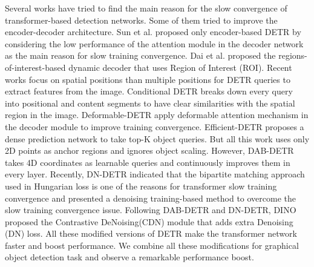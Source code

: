 \documentclass[sn-mathphys]{sn-jnl}\jyear{2021}\theoremstyle{thmstyleone}\newtheorem{theorem}{Theorem}\newtheorem{proposition}[theorem]{Proposition}\theoremstyle{thmstyletwo}\newtheorem{example}{Example}\newtheorem{remark}{Remark}\theoremstyle{thmstylethree}\newtheorem{definition}{Definition}\usepackage{amsmath}
\begin{document}
Several works \cite { CondDE, dab89, Reth78, anchorDE, Deformable54, DynamicDE} have tried to find the main reason for the slow convergence of transformer-based detection networks. Some of them tried to improve the encoder-decoder architecture. Sun et al. \cite{Reth78} proposed only encoder-based DETR by considering the low performance of the attention module in the decoder network as the main reason for slow training convergence. Dai et al. \cite{DynamicDE} proposed the regions-of-interest-based dynamic decoder that uses Region of Interest (ROI). Recent works \cite{dab89, CondDE, anchorDE, Deformable54} focus on spatial positions than multiple positions for DETR queries to extract features from the image. Conditional DETR \cite{CondDE} breaks down every query into positional and content segments to have clear similarities with the spatial region in the image. Deformable-DETR \cite{Deformable54} apply deformable attention mechanism in the decoder module to improve training convergence. Efficient-DETR \cite{efficientDE} proposes a dense prediction network to take top-K object queries. But all this work uses only 2D points as anchor regions and ignores object scaling. However, DAB-DETR \cite{dab89} takes 4D coordinates as learnable queries and continuously improves them in every layer. Recently, DN-DETR \cite{dn42} indicated that the bipartite matching approach used in Hungarian loss is one of the reasons for transformer slow training convergence and presented a denoising training-based method to overcome the slow training convergence issue. Following DAB-DETR and DN-DETR, DINO \cite{dino23} proposed the Contrastive DeNoising(CDN) module that adds extra Denoising (DN) loss. All these modified versions of DETR make the transformer network faster and boost performance. We combine all these modifications for graphical object detection task and observe a remarkable performance boost.\\ 
\end{document}
